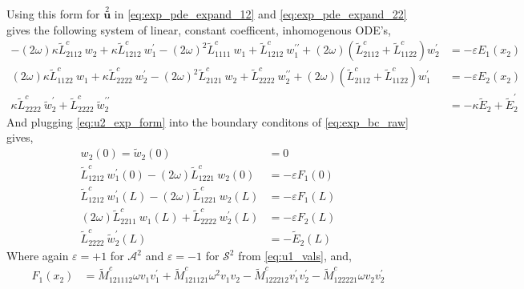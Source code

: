 \documentclass[11pt]{report}
\begin{document}
\begin{appendices}
\begin{equation}
\end{equation}
Using this form for $\overset{2}{\mathbf{u}}$ in \eqref{eq:exp_pde_expand_12} and \eqref{eq:exp_pde_expand_22} gives the following system of linear, constant coefficent, inhomogenous ODE's,
\begin{equation} \label{eq:exp_w_2_system}
\begin{aligned}
- (2 \omega) \kappa \tilde{L}^{c}_{2112} \: w_2 + \kappa \tilde{L}^{c}_{1212} \: w_1^\prime - (2 \omega)^2 \tilde{L}^{c}_{1111} \: w_1 + \tilde{L}^{c}_{1212} \: w_1^{\prime \prime} + (2 \omega) (\tilde{L}^{c}_{2112} + \tilde{L}^{c}_{1122}) w_2^\prime &= - \varepsilon E_1(x_2) \\
(2 \omega) \kappa \tilde{L}^{c}_{1122} \: w_1 + \kappa \tilde{L}^{c}_{2222} \: w_2^\prime - (2 \omega)^2 \tilde{L}^{c}_{2121} \: w_2 + \tilde{L}^{c}_{2222} \: w_2^{\prime \prime} + (2 \omega) (\tilde{L}^{c}_{2112} + \tilde{L}^{c}_{1122}) w_1^\prime &= - \varepsilon E_2(x_2) \\
\kappa \tilde{L}^c_{2222} \: \widetilde{w}_2^\prime + \tilde{L}^c_{2222} \: \widetilde{w}_2^{\prime \prime} &= - {\kappa \widetilde{E}_2 + \widetilde{E}_2^\prime }
\end{aligned}
\end{equation}
And plugging \eqref{eq:u2_exp_form} into the boundary conditons of \eqref{eq:exp_bc_raw} gives,
\begin{equation} \label{eq:exp_w_bcs}
\begin{aligned}
w_2(0) = \widetilde{w}_2(0) &=  0 \\
\tilde{L}^{c}_{1212} \: w_1^\prime(0) - (2 \omega) \tilde{L}^{c}_{1221} \: w_2(0) &= - \varepsilon F_1(0) \\
\tilde{L}^{c}_{1212} \: w_1^\prime(L) - (2 \omega) \tilde{L}^{c}_{1221} \: w_2(L) &= - \varepsilon F_1(L) \\
(2 \omega ) \tilde{L}^{c}_{2211} \: w_1(L) + \tilde{L}^{c}_{2222} \: w_2^\prime(L) &= - \varepsilon F_2(L)  \\
\tilde{L}^{c}_{2222} \: \widetilde{w}_2^\prime(L) &= - \widetilde{E}_2(L)
\end{aligned}
\end{equation}
Where again $\varepsilon = +1$ for $\mathcal{A}^2$ and $\varepsilon = -1$ for $\mathcal{S}^2$ from \eqref{eq:u1_vals}, and,
\begin{equation}
\begin{aligned}
F_1(x_2) &= \tilde{M}^c_{121112} \omega v_1 v_1^\prime +  \tilde{M}^c_{121121} \omega^2 v_1 v_2 - \tilde{M}^c_{122212} v_1^\prime v_2^\prime - \tilde{M}^c_{122221} \omega v_2 v_2^\prime \\

\end{aligned}
\end{equation}
\end{appendices}
\end{document}

